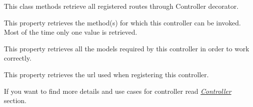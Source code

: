 \documentclass[letterpaper,10pt,english]{sphinxmanual}
\begin{document}
\begin{fulllineitems}
\begin{fulllineitems}
\end{fulllineitems}


\begin{fulllineitems}
\label{features/mvc:fantastico.mvc.controller_decorators.Controller.get_registered_routes}
This class methods retrieve all registered routes through Controller decorator.

\end{fulllineitems}


\begin{fulllineitems}
\label{features/mvc:fantastico.mvc.controller_decorators.Controller.method}
This property retrieves the method(s) for which this controller can be invoked. Most of the time only one value is
retrieved.

\end{fulllineitems}


\begin{fulllineitems}
\label{features/mvc:fantastico.mvc.controller_decorators.Controller.models}
This property retrieves all the models required by this controller in order to work correctly.

\end{fulllineitems}


\begin{fulllineitems}
\label{features/mvc:fantastico.mvc.controller_decorators.Controller.url}
This property retrieves the url used when registering this controller.

\end{fulllineitems}


\end{fulllineitems}


If you want to find more details and use cases for controller read {\hyperref[features/mvc:core-controller-section]{\emph{Controller}}} section.
\end{document}
